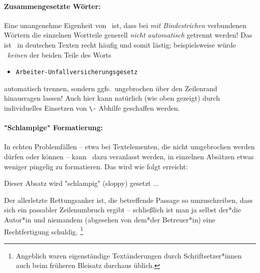 \paragraph{Zusammengesetzte Wörter:}
Eine unangenehme Eigenheit von \latex\ ist, dass bei \emph{mit Bindestrichen} verbundenen
Wörtern die einzelnen Wortteile generell \emph{nicht automatisch} getrennt werden!
Das ist \va\ in deutschen Texten recht häufig und somit lästig;
beispielsweise würde \latex\ \emph{keinen} der beiden Teile des Worts 
\begin{itemize}
\item[] \verb!Arbeiter-Unfallversicherungsgesetz!
\end{itemize}
automatisch trennen, sondern ggfs.\ ungebrochen über den Zeilenrand hinausragen
lassen! Auch hier kann natürlich (wie oben gezeigt) durch individuelles 
Einsetzen von \verb!\-! Abhilfe geschaffen werden.
%

\paragraph{"Schlampige" Formatierung:}
In echten Problemfällen -- etwa bei Textelementen, die nicht umgebrochen 
werden dürfen oder können -- kann \latex\ dazu veranlasst werden, in einzelnen Absätzen
etwas weniger pingelig zu formatieren. Das wird wie folgt erreicht:
%
\begin{LaTeXCode}[numbers=none]
\begin{sloppypar}
Dieser Absatz wird "schlampig" (sloppy) gesetzt ...
\end{sloppypar}
\end{LaTeXCode}
%
Der allerletzte Rettungsanker ist, die betreffende Passage so umzuschreiben, dass sich ein 
passabler Zeilenumbruch ergibt -- schließlich ist man ja selbst der*die Autor*in und 
niemandem (abgesehen von dem*der Betreuer*in) eine Rechtfertigung schuldig.%
\footnote{Angeblich waren eigenständige Textänderungen durch Schriftsetzer*innen
auch beim früheren Bleisatz durchaus üblich.}



